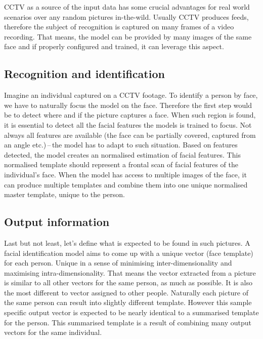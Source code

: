 CCTV as a source of the input data has some crucial advantages for real world scenarios over any random pictures in-the-wild. Usually CCTV produces feeds, therefore the subject of recognition is captured on many frames of a video recording. That means, the model can be provided by many images of the same face and if properly configured and trained, it can leverage this aspect.

\subsection{Recognition and identification}

Imagine an individual captured on a CCTV footage. To identify a person by face, we have to naturally focus the model on the face. Therefore the first step would be to detect where and if the picture captures a face. When such region is found, it is essential to detect all the facial features the models is trained to focus. Not always all features are available (the face can be partially covered, captured from an angle etc.)\,--\,the model has to adapt to such situation. Based on features detected, the model creates an normalised estimation of facial features. This normalised template should represent a frontal scan of facial features of the individual's face. When the model has access to multiple images of the face, it can produce multiple templates and combine them into one unique normalised master template, unique to the person.

\subsection{Output information}

Last but not least, let's define what is expected to be found in such pictures. A facial identification model aims to come up with a unique vector (face template) for each person. Unique in a sense of minimising inter-dimensionality and maximising intra-dimensionality. That means the vector extracted from a picture is similar to all other vectors for the same person, as much as possible. It is also the most different to vector assigned to other people. Naturally each picture of the same person can result into slightly different template. However this sample specific output vector is expected to be nearly identical to a summarised template for the person. This summarised template is a result of combining many output vectors for the same individual.
